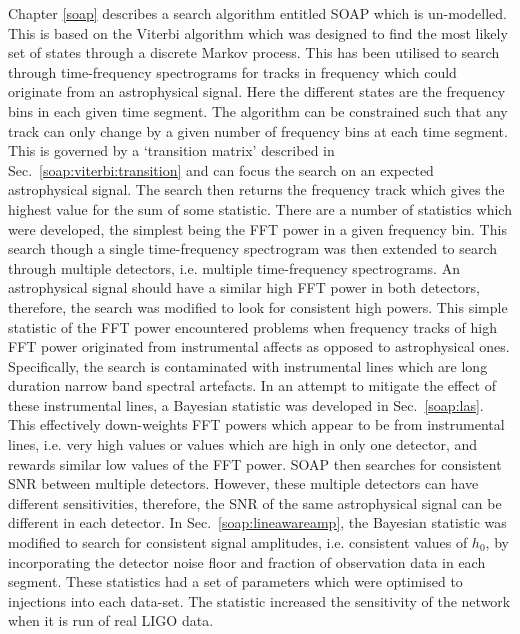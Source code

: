Chapter \ref{soap} describes a search algorithm entitled SOAP which is un-modelled. 
This is based on the Viterbi algorithm which was designed to find the most likely set of states through a discrete Markov process.
This has been utilised to search through time-frequency spectrograms for tracks in frequency which could originate from an astrophysical signal.
Here the different states are the frequency bins in each given time segment.
The algorithm can be constrained such that any track can only change by a given number of frequency bins at each time segment. 
This is governed by a `transition matrix' described in Sec.~\ref{soap:viterbi:transition} and can focus the search on an expected astrophysical signal.
The search then returns the frequency track which gives the highest value for the sum of some statistic.
There are a number of statistics which were developed, the simplest being the \gls{FFT} power in a given frequency bin.
This search though a single time-frequency spectrogram was then extended to search through multiple detectors, i.e. multiple time-frequency spectrograms.
An astrophysical signal should have a similar high \gls{FFT} power in both detectors, therefore, the search was modified to look for consistent high powers.
This simple statistic of the \gls{FFT} power encountered problems when frequency tracks of high \gls{FFT} power originated from instrumental affects as opposed to astrophysical ones.
Specifically, the search is contaminated with instrumental lines which are long duration narrow band spectral artefacts. 
In an attempt to mitigate the effect of these instrumental lines, a Bayesian statistic was developed in Sec.~\ref{soap:las}.
This effectively down-weights \gls{FFT} powers which appear to be from instrumental lines, i.e. very high values or values which are high in only one detector, and rewards similar low values of the \gls{FFT} power.
SOAP then searches for consistent \gls{SNR} between multiple detectors.
However, these multiple detectors can have different sensitivities, therefore, the \gls{SNR} of the same astrophysical signal can be different in each detector.
In Sec.~\ref{soap:lineawareamp}, the Bayesian statistic was modified to search for consistent signal amplitudes, i.e. consistent values of $h_0$, by incorporating the detector noise floor and fraction of observation data in each segment.
These statistics had a set of parameters which were optimised to injections into each data-set. 
The statistic increased the sensitivity of the network when it is run of real \gls{LIGO} data. 


